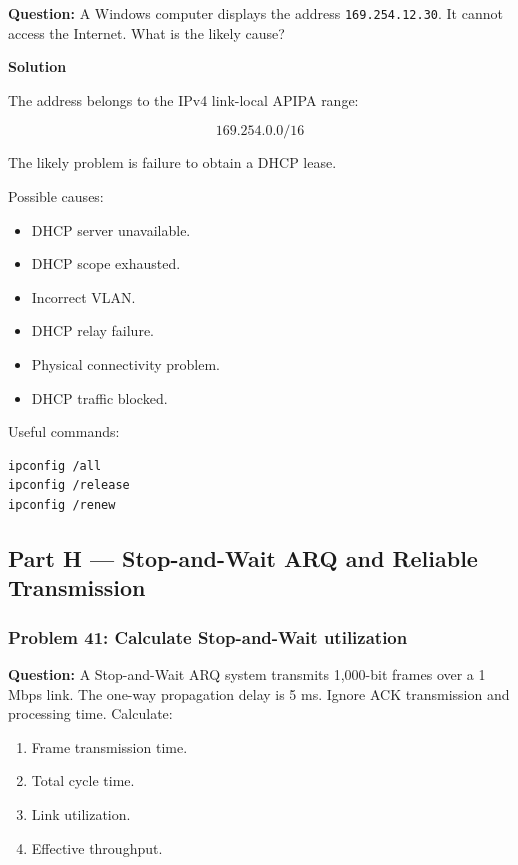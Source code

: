 \textbf{Question:} A Windows computer displays the address \texttt{169.254.12.30}. It cannot access the Internet. What is the likely cause?

\textbf{Solution}

The address belongs to the IPv4 link-local APIPA range:



\[
169.254.0.0/16
\]



The likely problem is failure to obtain a DHCP lease.

Possible causes:

\begin{itemize}
\item DHCP server unavailable.
\item DHCP scope exhausted.
\item Incorrect VLAN.
\item DHCP relay failure.
\item Physical connectivity problem.
\item DHCP traffic blocked.
\end{itemize}

Useful commands:

\begin{lstlisting}
ipconfig /all
ipconfig /release
ipconfig /renew
\end{lstlisting}

\subsection{Part H --- Stop-and-Wait ARQ and Reliable Transmission}
\subsubsection*{Problem 41: Calculate Stop-and-Wait utilization}

\textbf{Question:} A Stop-and-Wait ARQ system transmits 1,000-bit frames over a 1 Mbps link. The one-way propagation delay is 5 ms. Ignore ACK transmission and processing time. Calculate:

\begin{enumerate}
\item Frame transmission time.
\item Total cycle time.
\item Link utilization.
\item Effective throughput.
\end{enumerate}

